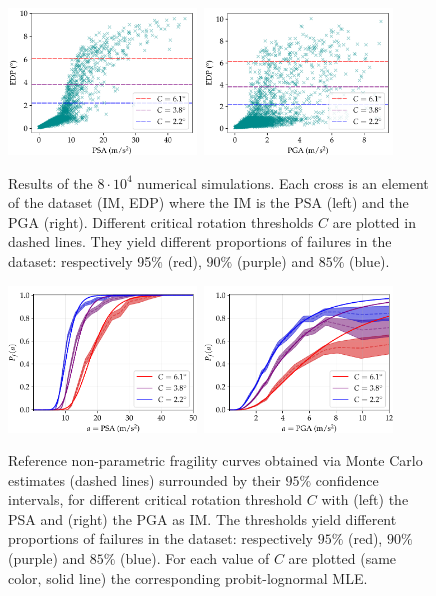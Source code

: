\begin{figure}[h!]
    \centering%
    \includegraphics[width=5cm]{figures/DoE/cloud_PSA_light.pdf}\ 
    \includegraphics[width=5cm]{figures/DoE/cloud_PGA_light.pdf}%
    \caption{Results of the $8\cdot10^4$ numerical simulations. Each cross is an element of the dataset (IM, EDP) where the IM is the PSA (left) and the PGA (right). Different critical rotation thresholds $C$ are plotted in dashed lines. They yield different proportions of failures in the dataset: respectively 95$\%$ (red), $90\%$ (purple) and $85\%$ (blue).}
    \label{fig:doe:scattersIMs}
    \end{figure}

    \begin{figure}[h!]
        \centering
        \includegraphics[width=5cm]{figures/DoE/refs_PSA.pdf}\ 
        \includegraphics[width=5cm]{figures/DoE/refs_PGA.pdf}
        \caption{{Reference non-parametric fragility curves obtained via Monte Carlo estimates (dashed lines) surrounded by their $95\%$ confidence intervals, for different critical rotation threshold $C$ with (left) the PSA and (right) the PGA as IM.} The thresholds yield different proportions of failures in the dataset: respectively $95\%$ (red), $90\%$ (purple) and $85\%$ (blue).
        For each value of $C$ are plotted (same color, solid line) the corresponding probit-lognormal MLE.}
        \label{fig:doe:reference-frags}
        \end{figure}


